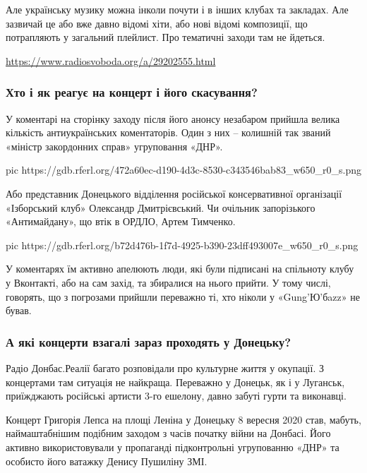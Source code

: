 Але українську музику можна інколи почути і в інших клубах та закладах.
Але зазвичай це або вже давно відомі хіти, або нові відомі композиції, що
потрапляють у загальний плейлист. Про тематичні заходи там не йдеться.

\url{https://www.radiosvoboda.org/a/29202555.html}

\subsubsection{Хто і як реагує на концерт і його скасування?}

У коментарі на сторінку заходу після його анонсу незабаром прийшла велика
кількість антиукраїнських коментаторів. Один з них – колишній так званий
«міністр закордонних справ» угруповання «ДНР».

\ifcmt
pic https://gdb.rferl.org/472a60ec-d190-4d3c-8530-c343546bab83_w650_r0_s.png
\fi

Або представник Донецького відділення російської консервативної організації
«Ізборський клуб» Олександр Дмитрієвський. Чи очільник запорізького
«Антимайдану», що втік в ОРДЛО, Артем Тимченко.

\ifcmt
pic https://gdb.rferl.org/b72d476b-1f7d-4925-b390-23dff493007e_w650_r0_s.png
\fi

У коментарях їм активно апелюють люди, які були підписані на спільноту клубу у
Вконтакті, або на сам захід, та збиралися на нього прийти. У тому числі,
говорять, що з погрозами прийшли переважно ті, хто ніколи у «Gung'Ю'бazz» не
бував.

\subsubsection{А які концерти взагалі зараз проходять у Донецьку?}

Радіо Донбас.Реалії багато розповідали про культурне життя у окупації. З
концертами там ситуація не найкраща. Переважно у Донецьк, як і у Луганськ,
приїжджають російські артисти 3-го ешелону, давно забуті гурти та
виконавці.


Концерт Григорія Лепса на площі Леніна у Донецьку 8 вересня 2020 став,
мабуть, наймаштабнішим подібним заходом з часів початку війни на Донбасі.
Його активно використовували у пропаганді підконтрольні угрупованню «ДНР»
та особисто його ватажку Денису Пушиліну ЗМІ.

